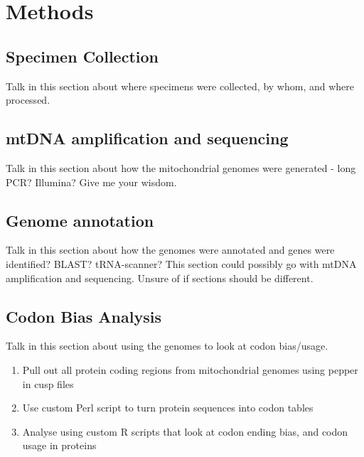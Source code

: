 \documentclass[../main.tex]{subfiles}
\begin{document}
\section{Methods}

\subsection{Specimen Collection}
Talk in this section about where specimens were collected, by whom, and where processed. 

\subsection{mtDNA amplification and sequencing}
Talk in this section about how the mitochondrial genomes were generated - long PCR? Illumina? Give me your wisdom. 

\subsection{Genome annotation}
Talk in this section about how the genomes were annotated and genes were identified? BLAST? tRNA-scanner? This section could possibly go with mtDNA amplification and sequencing. Unsure of if sections should be different.

\subsection{Codon Bias Analysis}
Talk in this section about using the genomes to look at codon bias/usage.
\begin{enumerate}
    \item Pull out all protein coding regions from mitochondrial genomes using pepper in cusp files
    \item Use custom Perl script to turn protein sequences into codon tables
    \item Analyse using custom R scripts that look at codon ending bias, and codon usage in proteins
\end{enumerate}
\end{document}

